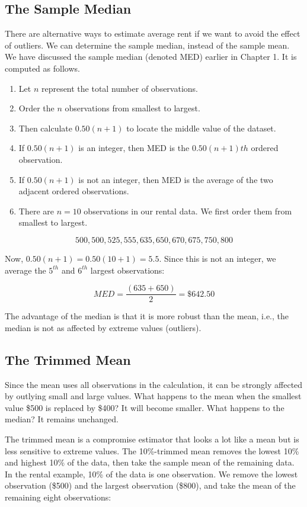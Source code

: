 \documentclass[11pt, chapterprefix=true]{scrbook}\usepackage[]{graphicx}\usepackage[]{color}
\begin{document}
\subsection{The Sample Median}

There are alternative ways to estimate average rent if we want to avoid the effect of outliers.  We can determine the sample median, instead of the sample mean.  We have discussed the sample median (denoted MED) earlier in Chapter 1.  It is computed as follows.

\begin{enumerate}
\item Let $n$ represent the total number of observations.
\item Order the $n$ observations from smallest to largest.
\item Then calculate $0.50(n + 1)$ to locate the middle value of the dataset.
\item If $0.50(n + 1)$ is an integer, then MED is the $0.50(n + 1)th$ ordered observation.
\item If $0.50(n + 1)$ is not an integer, then MED is the average of the two adjacent ordered observations.
\item There are $n = 10$ observations in our rental data.  We first order them from smallest to largest.
\end{enumerate}

$$ 500, 500, 525, 555, 635, 650, 670, 675, 750, 800 $$

Now, $0.50(n + 1) = 0.50(10 + 1) = 5.5$.  Since this is not an integer, we average the $5^{th}$ and $6^{th}$ largest observations:

$$MED = \frac{(635 + 650)}{2} = \$642.50$$

The advantage of the median is that it is more robust than the mean, i.e., the median is not as affected by extreme values (outliers).

\subsection{The Trimmed Mean}

Since the mean uses all observations in the calculation, it can be strongly affected by outlying small and large values.  What happens to the mean when the smallest value \$500 is replaced by \$400?  It will become smaller.  What happens to the median?  It remains unchanged.

The trimmed mean is a compromise estimator that looks a lot like a mean but is less sensitive to extreme values.  The 10\%-trimmed mean removes the lowest 10\% and highest 10\% of the data, then take the sample mean of the remaining data.  In the rental example, 10\% of the data is one observation. We remove the lowest
observation (\$500) and the largest observation (\$800), and take the mean of the remaining eight observations:
\end{document}
